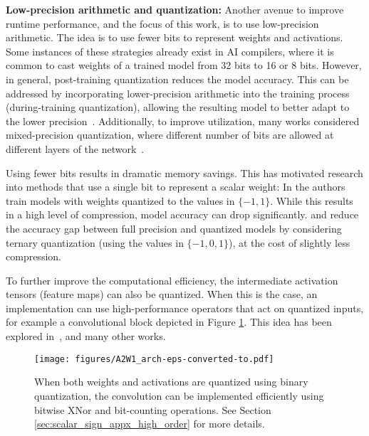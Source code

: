 \documentclass[10pt,twocolumn,letterpaper]{article}
\begin{document}
{\bf Low-precision arithmetic and quantization:}
Another avenue to improve runtime performance, and the focus of this work, is to use low-precision arithmetic. The idea is to use fewer bits to represent weights and activations. Some instances of these strategies already exist in AI compilers, where it is common to cast weights of a trained model from 32 bits to 16 or 8 bits. However, in general, post-training quantization reduces the model accuracy. This can be addressed by incorporating lower-precision arithmetic into the training process (during-training quantization), allowing the resulting model to better adapt to the lower precision~\cite{gupta2015deep,jacob2018quantization}. Additionally, to improve utilization, many works considered mixed-precision quantization, where different number of bits are allowed at different layers of the network~\cite{dong2019hawq,wang2019haq,wu2018mixed}.

Using fewer bits results in dramatic memory savings. This has motivated research into methods that use a single bit to represent a scalar weight: In \cite{courbariaux2015binaryconnect} the authors train models with weights quantized to the values in $\{-1, 1\}$. While this results in a high level of compression, model accuracy can drop significantly. \cite{li2016ternary} and \cite{zhu2016trained} reduce the accuracy gap between full precision and quantized models by considering ternary quantization (using the values in $\{-1, 0, 1\}$), at the cost of slightly less compression.

To further improve the computational efficiency, the intermediate activation tensors (feature maps) can also be quantized. When this is the case, an implementation can use high-performance operators that act on quantized inputs, for example a convolutional block depicted in Figure \ref{fig:arch}. This idea has been explored in~\cite{cai2017deep,courbariaux2016binarized,hubara2017quantized,lin2017towards,mishra2017wrpn,park2018value,rastegari2016xnor,zhang2018lq,zhou2016dorefa}, and many other works.

\begin{figure}[htb!]
\begin{center}
\texttt{[image: figures/A2W1\_arch-eps-converted-to.pdf]}
\end{center}
\caption{When both weights and activations are quantized using binary quantization, the convolution can be implemented efficiently using bitwise XNor and bit-counting operations. See Section \ref{sec:scalar_sign_appx_high_order} for more details.}
\label{fig:arch}
\end{figure}
\end{document}
